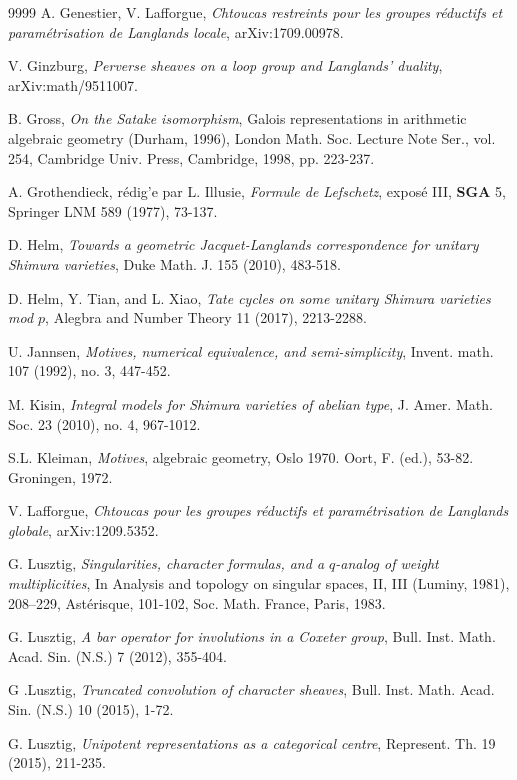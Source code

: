 \documentclass[11pt]{amsart}
\theoremstyle{definition}
\theoremstyle{definition}
\theoremstyle{definition}
\numberwithin{equation}{subsection}
\begin{document}
\begin{thebibliography}{9999}
A. Genestier, V. Lafforgue, {\it Chtoucas restreints pour les groupes r\'eductifs et param\'etrisation de Langlands locale},  arXiv:1709.00978.

V. Ginzburg, {\it Perverse sheaves on a loop group and Langlands' duality}, arXiv:math/9511007.

B. Gross, {\it On the Satake isomorphism}, Galois representations in arithmetic algebraic geometry (Durham, 1996), London Math. Soc. Lecture Note Ser., vol. 254, Cambridge Univ. Press, Cambridge, 1998, pp. 223-237.

A. Grothendieck, r\'edig'e par L. Illusie, {\it Formule de Lefschetz}, expos\'e III, {\bf SGA} 5, Springer LNM 589 (1977), 73-137.

 D. Helm, {\it Towards a geometric Jacquet-Langlands correspondence for unitary Shimura varieties}, Duke Math. J. 155 (2010), 483-518.

 D. Helm, Y. Tian, and L. Xiao, {\it Tate cycles on some unitary Shimura varieties mod $p$},  Alegbra and Number Theory 11 (2017), 2213-2288. 

U. Jannsen, {\it Motives, numerical equivalence, and semi-simplicity}, Invent. math. 107 (1992), no. 3, 447-452.

 M. Kisin, {\it Integral models for Shimura varieties of abelian type}, J. Amer. Math. Soc. 23 (2010), no. 4, 967-1012.

S.L. Kleiman, {\it Motives}, algebraic geometry, Oslo 1970. Oort, F. (ed.), 53-82. Groningen, 1972.

 V. Lafforgue, {\it Chtoucas pour les groupes r\'eductifs et param\'etrisation de Langlands globale}, arXiv:1209.5352.

G. Lusztig, {\it Singularities, character formulas, and a $q$-analog of weight multiplicities}, In Analysis and topology on singular spaces, II, III (Luminy, 1981), 208--229, Ast\'erisque, 101-102, Soc. Math. France, Paris, 1983.

G. Lusztig, {\it A bar operator for involutions in a Coxeter group}, Bull. Inst. Math. Acad. Sin. (N.S.) 7 (2012), 355-404.

G .Lusztig, {\it Truncated convolution of character sheaves}, Bull. Inst. Math. Acad. Sin. (N.S.) 10 (2015), 1-72. 

G. Lusztig, {\it Unipotent representations as a categorical centre}, Represent. Th. 19 (2015), 211-235.


\end{thebibliography}
\end{document}
